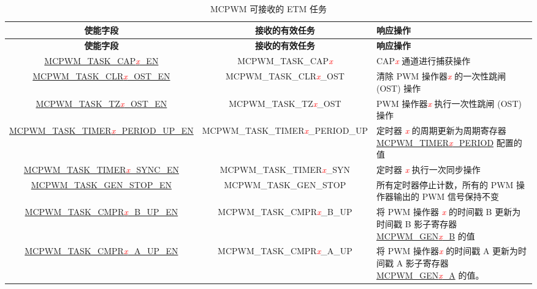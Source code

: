 \begin{longtable}{ | c | c | C{5cm} |}
    \caption{MCPWM 可接收的 ETM 任务}
    \label{tab:mcpwm-etm-task}
    \\\hline
   \textbf{使能字段} & \textbf{接收的有效任务} & \textbf{响应操作} \\\hline
    \endfirsthead
    \hline
    \textbf{使能字段} & \textbf{接收的有效任务} & \textbf{响应操作}  \\\hline
    \endhead
    \hline
    \endfoot
    
    \hyperref[fielddesc:MCPWMTASKCAP0EN]{MCPWM\_TASK\_CAP\textcolor{red}{\it{x}}\_EN}
    &  MCPWM\_TASK\_CAP\textcolor{red}{\it{x}}
    &  CAP\textcolor{red}{\it{x}} 通道进行捕获操作 \\\hline
    \hyperref[fielddesc:MCPWMTASKCLR0OSTEN]{MCPWM\_TASK\_CLR\textcolor{red}{\it{x}}\_OST\_EN}
    &  MCPWM\_TASK\_CLR\textcolor{red}{\it{x}}\_OST
    &  清除 PWM 操作器\textcolor{red}{\it{x}} 的一次性跳闸 (OST) 操作 \\\hline
    \hyperref[fielddesc:MCPWMTASKTZ0OSTEN]{MCPWM\_TASK\_TZ\textcolor{red}{\it{x}}\_OST\_EN}
    &  MCPWM\_TASK\_TZ\textcolor{red}{\it{x}}\_OST
    &  PWM 操作器\textcolor{red}{\it{x}} 执行一次性跳闸 (OST) 操作 \\\hline
    \hyperref[fielddesc:MCPWMTASKTIMER0PERIODUPEN]{MCPWM\_TASK\_TIMER\textcolor{red}{\it{x}}\_PERIOD\_UP\_EN}
    &  MCPWM\_TASK\_TIMER\textcolor{red}{\it{x}}\_PERIOD\_UP
    &  定时器 \textcolor{red}{\it{x}} 的周期更新为周期寄存器 \hyperref[fielddesc:MCPWMTIMER0PERIOD]{MCPWM\_TIMER\textcolor{red}{\it{x}}\_PERIOD} 配置的值 \\\hline
    \hyperref[fielddesc:MCPWMTASKTIMER0SYNCEN]{MCPWM\_TASK\_TIMER\textcolor{red}{\it{x}}\_SYNC\_EN}
    &  MCPWM\_TASK\_TIMER\textcolor{red}{\it{x}}\_SYN
    &  定时器 \textcolor{red}{\it{x}} 执行一次同步操作 \\\hline
    \hyperref[fielddesc:MCPWMTASKGENSTOPEN]{MCPWM\_TASK\_GEN\_STOP\_EN}
    &  MCPWM\_TASK\_GEN\_STOP
    &  所有定时器停止计数，所有的 PWM 操作器输出的 PWM 信号保持不变 \\\hline
    \hyperref[fielddesc:MCPWMTASKCMPR0BUPEN]{MCPWM\_TASK\_CMPR\textcolor{red}{\it{x}}\_B\_UP\_EN}
    &  MCPWM\_TASK\_CMPR\textcolor{red}{\it{x}}\_B\_UP
    &  将 PWM 操作器 \textcolor{red}{\it{x}} 的时间戳 B 更新为时间戳 B 影子寄存器 \hyperref[fielddesc:MCPWMGEN0B]{MCPWM\_GEN\textcolor{red}{\it{x}}\_B} 的值 \\\hline
    \hyperref[fielddesc:MCPWMTASKCMPR0AUPEN]{MCPWM\_TASK\_CMPR\textcolor{red}{\it{x}}\_A\_UP\_EN}
    &  MCPWM\_TASK\_CMPR\textcolor{red}{\it{x}}\_A\_UP
    &  将 PWM 操作器\textcolor{red}{\it{x}} 的时间戳 A 更新为时间戳 A 影子寄存器 \hyperref[fielddesc:MCPWMGEN0A]{MCPWM\_GEN\textcolor{red}{\it{x}}\_A} 的值。 \\\hline
\end{longtable}